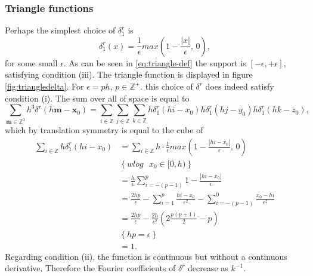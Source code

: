 \documentclass[a4paper,
twoside=false,abstract=false,numbers=noenddot,
titlepage=false,headings=small,parskip=half,version=last]{scrartcl}
\begin{document}
\subsubsection{Triangle functions}\label{section:triangle-delta}
Perhaps the simplest choice of $\delta^{r}_{1}$ is
\begin{equation}
\delta^{r}_{1}(x) = \frac{1}{\epsilon}max\left(1-\frac{|x|}{\epsilon}\text{, }0\right),\label{eq:triangle-def}
\end{equation}
for some small $\epsilon$.
As can be seen in \eqref{eq:triangle-def} the support is $[-\epsilon,+\epsilon]$, satisfying condition (iii).
The triangle function is displayed in figure \ref{fig:triangledelta}.
For $\epsilon=ph$, $p\in\mathbb{Z}^+$. this choice of $\delta^r$ does indeed satisfy condition (i). The sum over all of space is equal to 
\begin{equation}
\sum_{\mathbf{m}\in\mathbb{Z}^3}h^3\delta^{r}(h\mathbf{m}-\mathbf{x}_0)	= \sum_{i\in \mathbb{Z}}\sum_{j\in \mathbb{Z}}\sum_{k\in \mathbb{Z}}h\delta^{r}_1(hi-x_0)h\delta^{r}_1(hj-y_0)h\delta^{r}_1(hk-z_0),\label{eq:splitdelta3dto1d}
\end{equation}
which by translation symmetry is equal to the cube of
\begin{align}
\sum_{i\in \mathbb{Z}}h\delta^{r}_1(hi-x_0) &= \sum_{i\in \mathbb{Z}}h\cdot \frac{1}{\epsilon}max\left(1-\frac{|hi-x_0|}{\epsilon}\text{, }0\right)\nonumber\\
		& \left\{ wlog \text{ }x_0\in [0,h) \right\}\nonumber\\
		&= \frac{h}{\epsilon} \sum_{i=-(p-1)}^p 1-\frac{|hi-x_0|}{\epsilon}\nonumber\\
		&= \frac{2hp}{\epsilon} - \sum_{i=1}^p\frac{hi-x_0}{\epsilon^2} - \sum_{i=-(p-1)}^0\frac{x_0-hi}{\epsilon^2}\nonumber\\
		&= \frac{2hp}{\epsilon} - \frac{2h}{\epsilon^2}\left(2\frac{p(p+1)}{2} - p \right)\nonumber\\
		& \left\{ hp = \epsilon \right\}\nonumber\\
		&= 1.\nonumber
\end{align}
Regarding condition (ii), the function is continuous but without a continuous derivative.
Therefore the Fourier coefficients of $\delta^r$ decrease as $k^{-1}$.

\end{document}
